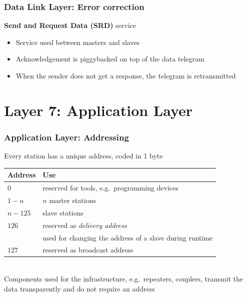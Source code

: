 \documentclass{beamer}
\begin{document}
\begin{frame}
  \frametitle{Data Link Layer: Error correction}
  \textbf{Send and Request Data (SRD)} service
  \begin{itemize}
    \item Service used between masters and slaves
    \item Acknowledgement is piggybacked on top of the data telegram
    \item When the sender does not get a response, the telegram is retransmitted
  \end{itemize}
\end{frame}


\section{Layer 7: Application Layer}
\begin{frame}
  \frametitle{Application Layer: Addressing}
  Every station has a unique address, coded in 1 byte
  \begin{center}
    \footnotesize
    \begin{tabular}[h]{l|l}
      \textbf{Address}  & \textbf{Use} \\
      \hline
      $0$               & reserved for tools, e.g.\ programming devices \\
      $1 - n$           & $n$ master stations \\
      $n - 125$         & slave stations \\
      $126$             & reserved as \textit{delivery address} \\
                        & used for changing the address of a slave during runtime \\
      $127$             & reserved as broadcast address
    \end{tabular}
    \normalsize
  \end{center}
  \hfill \\
  Components used for the infrastructure, e.g.\ repeaters, couplers, transmit the data
  transparently and do not require an address \\
\end{frame}
\end{document}
